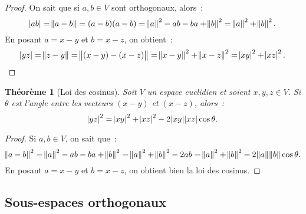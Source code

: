 \documentclass{article}
\newtheorem{thm}{Théorème}[section]
\theoremstyle{definition}
\theoremstyle{remark}
\begin{document}
		\begin{proof} On sait que si $a, b \in V$ sont orthogonaux, alors~:
		\[\abs {ab} = \norm {a-b} = (a-b)(a-b) = \norm a^2 - ab - ba + \norm b^2 = \norm a^2 + \norm b^2.\]
		En posant $a = x-y$ et $b = x-z$, on obtient~:
		\[\abs {yz} = \norm{z - y} = \norm{(x-y) - (x-z)} = \norm{x-y}^2 + \norm {x-z}^2 = \abs{xy}^2 + \abs {xz}^2.\]
		\end{proof}

		\begin{thm}[Loi des cosinus] Soit $V$ un espace euclidien et soient $x, y, z \in V$. Si $\theta$ est l'angle entre les vecteurs $(x-y)$ et $(x-z)$,
		alors~:
		\[\abs {yz}^2 = \abs {xy}^2 + \abs {xz}^2 - 2\abs{xy}\abs{xz}\cos\theta.\]
		\end{thm}

		\begin{proof} Si $a, b \in V$, on sait que~:
		\[\norm {a-b}^2 = \norm a^2 - ab - ba + \norm b^2 = \norm a^2 + \norm b^2 - 2ab = \norm a^2 + \norm b^2 - 2\norm a\norm b\cos \theta.\]
		En posant $a = x-y$ et $b = x-z$, on obtient bien la loi des cosinus.
		\end{proof}

	\subsection{Sous-espaces orthogonaux}
\end{document}
